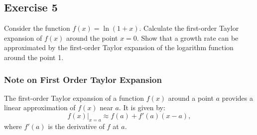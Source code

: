 \documentclass[11pt]{article}
\begin{document}
\subsection*{Exercise 5}
Consider the function \( f(x) = \ln(1+x) \). 
Calculate the first-order Taylor expansion of \( f(x) \) around the point \( x = 0 \).
Show that a growth rate can be approximated by the first-order Taylor expansion 
of the logarithm function around the point 1.

\subsubsection*{Note on First Order Taylor Expansion}
The first-order Taylor expansion of a function \( f(x) \) around a point \( a \) provides a linear approximation of \( f(x) \) near \( a \). It is given by:
\[
f(x) \big|_{x=a} \approx f(a) + f'(a)(x - a),
\]
where \( f'(a) \) is the derivative of \( f \) at \( a \).

\end{document}
